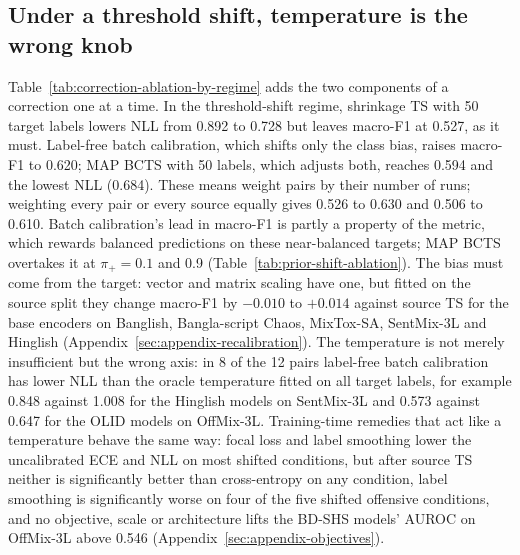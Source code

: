 \subsection{Under a threshold shift, temperature is the wrong knob}
\label{sec:results-threshold}

Table~\ref{tab:correction-ablation-by-regime} adds the two components of a correction one at a time. In the
threshold-shift regime, shrinkage TS with 50 target labels lowers NLL from 0.892 to 0.728 but leaves macro-F1 at
0.527, as it must. Label-free batch calibration, which shifts only the class bias, raises macro-F1 to 0.620; MAP BCTS
with 50 labels, which adjusts both, reaches 0.594 and the lowest NLL (0.684). These means weight pairs by their number
of runs; weighting every pair or every source equally gives 0.526 to 0.630 and 0.506 to 0.610. Batch calibration's lead in macro-F1 is
partly a property of the metric, which rewards balanced predictions on these near-balanced targets; MAP BCTS overtakes it
at $\pi_+ = 0.1$ and 0.9 (Table~\ref{tab:prior-shift-ablation}). The bias must come from the target: vector and matrix scaling have
one, but fitted on the source split they change macro-F1 by $-0.010$ to $+0.014$ against source TS for the base encoders on Banglish, Bangla-script Chaos,
MixTox-SA, SentMix-3L and Hinglish (Appendix~\ref{sec:appendix-recalibration}). The temperature is not merely
insufficient but the wrong axis: in 8 of the 12 pairs label-free batch calibration has lower NLL than the oracle temperature
fitted on all target labels, for example 0.848 against 1.008 for the Hinglish models on SentMix-3L and 0.573 against 0.647 for the
OLID models on OffMix-3L. Training-time remedies that act like a temperature behave the same way: focal loss and label
smoothing lower the uncalibrated ECE and NLL on most shifted conditions, but after source TS neither is significantly
better than cross-entropy on any condition, label smoothing is significantly worse on four of the five shifted
offensive conditions, and no objective, scale or architecture lifts the BD-SHS models' AUROC on OffMix-3L above 0.546
(Appendix~\ref{sec:appendix-objectives}).



